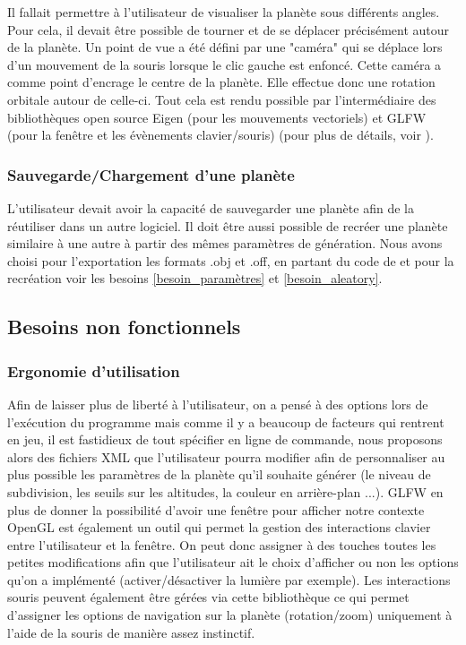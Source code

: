 \documentclass[a4paper]{article}
\begin{document}
Il fallait permettre à l’utilisateur de visualiser la planète sous différents angles. Pour cela, il devait être possible de tourner et de se déplacer précisément autour de la planète. Un point de vue a été défini par une "caméra" qui se déplace lors d’un mouvement de la souris lorsque le clic gauche est enfoncé. Cette caméra a comme point d’encrage le centre de la planète. Elle effectue donc une rotation orbitale autour de celle-ci. Tout cela est rendu possible par l’intermédiaire des bibliothèques open source Eigen (pour les mouvements vectoriels) et GLFW (pour la fenêtre et les évènements clavier/souris) (pour plus de détails, voir \cite{TutoCamera}).

\subsubsection{Sauvegarde/Chargement d'une planète}

L’utilisateur devait avoir la capacité de sauvegarder une planète afin de la réutiliser dans un autre logiciel. Il doit être aussi possible de recréer une planète similaire à une autre à partir des mêmes paramètres de génération. Nous avons choisi pour l'exportation les formats .obj et .off, en partant du code de \cite{TD_3D} et pour la recréation voir les besoins \ref{besoin_paramètres} et \ref{besoin_aleatory}.

\subsection{Besoins non fonctionnels}


\subsubsection{Ergonomie d'utilisation}
Afin de laisser plus de liberté à l'utilisateur, on a pensé à des options lors de l'exécution du programme mais comme il y a beaucoup de facteurs qui rentrent en jeu, il est fastidieux de tout spécifier en ligne de commande, nous proposons alors des fichiers XML que l'utilisateur pourra modifier afin de personnaliser au plus possible les paramètres de la planète qu'il souhaite générer (le niveau de subdivision, les seuils sur les altitudes, la couleur en arrière-plan ...).
GLFW en plus de donner la possibilité d'avoir une fenêtre pour afficher notre contexte OpenGL est également un outil qui permet  la gestion des interactions clavier entre l'utilisateur et la fenêtre. On peut donc assigner à des touches toutes les petites modifications afin que l'utilisateur ait le choix d'afficher ou non les options qu'on a implémenté (activer/désactiver la lumière par exemple). Les interactions souris peuvent également être gérées via cette bibliothèque ce qui permet d'assigner les options de navigation sur la planète (rotation/zoom) uniquement à l'aide de la souris de manière assez instinctif.
\end{document}
